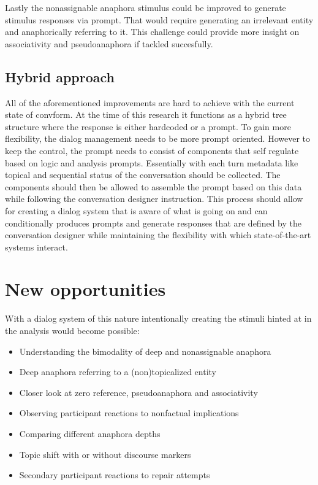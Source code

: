\documentclass[12pt]{report}
\begin{document}
{        Lastly the nonassignable anaphora stimulus could be improved to generate stimulus responses via prompt.
        That would require generating an irrelevant entity and anaphorically referring to it.
        This challenge could provide more insight on associativity and pseudoanaphora if tackled succesfully.

    \subsection{Hybrid approach}

            All of the aforementioned improvements are hard to achieve with the current state of convform.
            At the time of this research it functions as a hybrid tree structure where the response is either
            hardcoded or a prompt.
            To gain more flexibility, the dialog management needs to be more prompt oriented.
            However to keep the control, the prompt needs to consist of components that self regulate based on
            logic and analysis prompts.
            Essentially with each turn metadata
            like topical and sequential status of the conversation should be collected.
            The components should then be allowed to assemble the prompt
            based on this data while following the conversation designer instruction.
            This process should allow for creating a dialog system that is aware of what is going on
            and can conditionally produces prompts and generate responses
            that are defined by the conversation designer
            while maintaining the flexibility with which state-of-the-art systems interact.

\section{New opportunities}

With a dialog system of this nature
intentionally creating the stimuli hinted at in the analysis would become possible:

    \begin{itemize}
    \item{Understanding the bimodality of deep and nonassignable anaphora}
    \item{Deep anaphora referring to a (non)topicalized entity}
    \item{Closer look at zero reference, pseudoanaphora and associativity}
    \item{Observing participant reactions to nonfactual implications}
    \item{Comparing different anaphora depths}
    \item{Topic shift with or without discourse markers}
    \item{Secondary participant reactions to repair attempts}
    \end{itemize}

}
\end{document}
